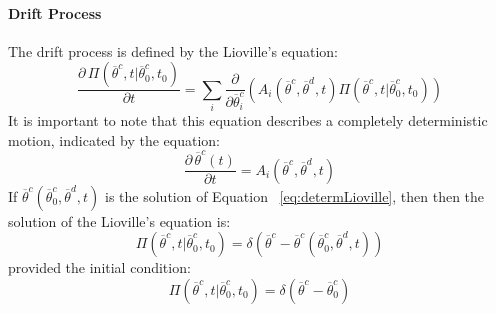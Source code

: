 \paragraph{Drift Process}
\label{sec:CKDrift}
The drift process is defined by the Lioville’s equation:
\begin{equation}
\label{eq:lioville}
  \frac{\partial \, \Pi \left (\overline{\theta}^{c},t|\overline{\theta}^{c}_{0},t_{0}  \right ) }{\partial t} = \sum_{i}\frac{\partial }{\partial \overline{\theta}^{c}_{i}}\left ( A_{i}\left ( \overline{\theta}^{c},\overline{\theta}^{d},t \right ) \Pi \left (\overline{\theta}^{c},t|\overline{\theta}^{c}_{0},t_{0}  \right ) \right )
\end{equation}
It is important to note that this equation describes a completely deterministic motion, indicated by the equation:
\begin{equation}
\label{eq:determLioville}
   \frac{\partial \, \overline{\theta}^{c}\left ( t \right ) }{\partial t} = A_{i}\left ( \overline{\theta}^{c},\overline{\theta}^{d},t \right ) 
\end{equation}
If $\overline{\theta}^{c} \left (\overline{\theta}^{c}_{0},\overline{\theta}^{d},t  \right )$ is the solution of Equation ~\ref{eq:determLioville}, then then the solution of the Lioville's equation is:
\begin{equation}
\label{eq:solLioville}
\Pi \left (\overline{\theta}^{c},t|\overline{\theta}^{c}_{0},t_{0}  \right ) = \delta\left ( \overline{\theta}^{c} - \overline{\theta}^{c}\left ( \overline{\theta}^{c}_{0},\overline{\theta}^{d},t \right ) \right )
\end{equation}
provided the initial condition:
\begin{equation}
\label{eq:solLiovilleInitCond}
\Pi \left (\overline{\theta}^{c},t|\overline{\theta}^{c}_{0},t_{0}  \right ) = \delta\left ( \overline{\theta}^{c} - \overline{\theta}^{c}_{0} \right )
\end{equation}
%
%
%
%
